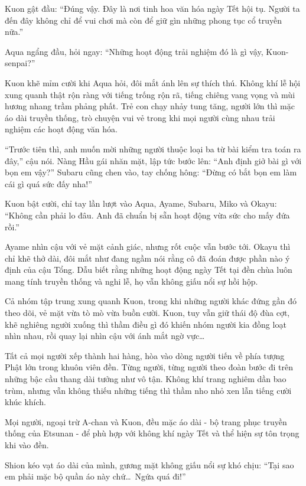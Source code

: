 \documentclass[../main.tex]{subfiles}
\begin{document}
Kuon gật đầu: ``Đúng vậy. Đây là nơi tinh hoa văn hóa ngày Tết hội tụ. Người ta đến đây không chỉ để vui chơi mà còn để giữ gìn những phong tục cổ truyền nữa.''

Aqua ngẩng đầu, hỏi ngay: ``Những hoạt động trải nghiệm đó là gì vậy, Kuon-senpai?''

Kuon khẽ mỉm cười khi Aqua hỏi, đôi mắt ánh lên sự thích thú. Không khí lễ hội xung quanh thật rộn ràng với tiếng trống rộn rã, tiếng chiêng vang vọng và mùi hương nhang trầm phảng phất. Trẻ con chạy nhảy tung tăng, người lớn thì mặc áo dài truyền thống, trò chuyện vui vẻ trong khi mọi người cùng nhau trải nghiệm các hoạt động văn hóa.

``Trước tiên thì, anh muốn mời những người thuộc loại ba từ bài kiểm tra toán ra đây,'' cậu nói. Nàng Hầu gái nhăn mặt, lập tức bước lên: ``Anh định giở bài gì với bọn em vậy?'' Subaru cũng chen vào, tay chống hông: ``Đừng có bắt bọn em làm cái gì quá sức đấy nha!''

Kuon bật cười, chỉ tay lần lượt vào Aqua, Ayame, Subaru, Miko và Okayu: ``Không cần phải lo đâu. Anh đã chuẩn bị sẵn hoạt động vừa sức cho mấy đứa rồi.''

Ayame nhìn cậu với vẻ mặt cảnh giác, nhưng rốt cuộc vẫn bước tới. Okayu thì chỉ khẽ thở dài, đôi mắt như đang ngầm nói rằng cô đã đoán được phần nào ý định của cậu Tổng. Dẫu biết rằng những hoạt động ngày Tết tại đền chùa luôn mang tính truyền thống và nghi lễ, họ vẫn không giấu nổi sự hồi hộp.

Cả nhóm tập trung xung quanh Kuon, trong khi những người khác đứng gần đó theo dõi, vẻ mặt vừa tò mò vừa buồn cười. Kuon, tuy vẫn giữ thái độ đùa cợt, khẽ nghiêng người xuống thì thầm điều gì đó khiến nhóm người kia đồng loạt nhìn nhau, rồi quay lại nhìn cậu với ánh mắt ngờ vực\dots

\ct

Tất cả mọi người xếp thành hai hàng, hòa vào dòng người tiến về phía tượng Phật lớn trong khuôn viên đền. Từng người, từng người theo đoàn bước đi trên những bậc cầu thang dài tưởng như vô tận. Không khí trang nghiêm dần bao trùm, nhưng vẫn không thiếu những tiếng thì thầm nho nhỏ xen lẫn tiếng cười khúc khích.

Mọi người, ngoại trừ A-chan và Kuon, đều mặc áo dài - bộ trang phục truyền thống của Etsunan - để phù hợp với không khí ngày Tết và thể hiện sự tôn trọng khi vào đền.

Shion kéo vạt áo dài của mình, gương mặt không giấu nổi sự khó chịu: ``Tại sao em phải mặc bộ quần áo này chứ\dots\ Ngứa quá đi!''
\end{document}
